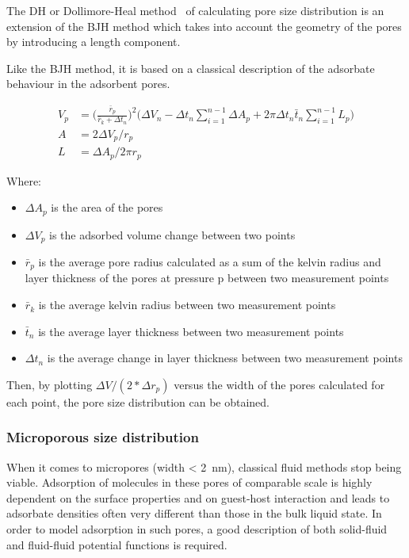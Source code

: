 The DH or Dollimore-Heal
method~\cite{dollimorePoresizeDistributionTypical1970}
of calculating pore size distribution is an
extension of the BJH method which takes into account the
geometry of the pores by introducing a length component.

Like the BJH method, it is based on a classical description of
the adsorbate behaviour in the adsorbent pores.

\begin{align}
	V_p & = \Big(\frac{\bar{r}_p}{\bar{r}_k + \Delta t_n}\Big)^2
	\Big(\Delta V_n - \Delta t_n \sum_{i=1}^{n-1} \Delta A_p
	+ 2 \pi \Delta t_n \bar{t}_n \sum_{i=1}^{n-1} L_p\Big)       \\
	A   & = 2 \Delta V_p / r_p                                   \\
	L   & = \Delta A_p / 2 \pi r_p
\end{align}

Where:
\begin{itemize}

	\item \(\Delta A_p\) is the area of the pores
	\item \(\Delta V_p\) is the adsorbed volume change between two points
	\item \(\bar{r}_p\) is the average pore radius calculated as a sum of the
	      kelvin radius and layer thickness of the pores at pressure p between two
	      measurement points
	\item \(\bar{r}_k\) is the average kelvin radius between two measurement points
	\item \(\bar{t}_n\) is the average layer thickness between two measurement points
	\item \(\Delta t_n\) is the average change in layer thickness between two measurement points
\end{itemize}

Then, by plotting \(\Delta V/(2*\Delta r_p)\) versus the width of the pores calculated
for each point, the pore size distribution can be obtained.

\subsubsection{Microporous size distribution}

When it comes to micropores (width \SI{< 2}{\nano\metre}), classical
fluid methods stop being viable. Adsorption of molecules in these pores
of comparable scale is highly dependent on the surface properties and
on guest-host interaction and leads to adsorbate densities often
very different than those in the bulk liquid state.
In order to model adsorption in such pores, a good description of
both solid-fluid and fluid-fluid potential functions is required.

